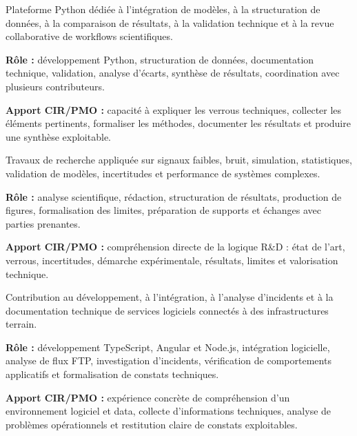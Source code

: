 \documentclass[8pt,a4paper,ragged2e,withhyper]{altacv}
\begin{document}
Plateforme Python dédiée à l’intégration de modèles, à la structuration de données, à la comparaison de résultats, à la validation technique et à la revue collaborative de workflows scientifiques.

\textbf{Rôle :} développement Python, structuration de données, documentation technique, validation, analyse d’écarts, synthèse de résultats, coordination avec plusieurs contributeurs.

\textbf{Apport CIR/PMO :} capacité à expliquer les verrous techniques, collecter les éléments pertinents, formaliser les méthodes, documenter les résultats et produire une synthèse exploitable.

\divider


Travaux de recherche appliquée sur signaux faibles, bruit, simulation, statistiques, validation de modèles, incertitudes et performance de systèmes complexes.

\textbf{Rôle :} analyse scientifique, rédaction, structuration de résultats, production de figures, formalisation des limites, préparation de supports et échanges avec parties prenantes.

\textbf{Apport CIR/PMO :} compréhension directe de la logique R\&D : état de l’art, verrous, incertitudes, démarche expérimentale, résultats, limites et valorisation technique.

\divider


Contribution au développement, à l’intégration, à l’analyse d’incidents et à la documentation technique de services logiciels connectés à des infrastructures terrain.

\textbf{Rôle :} développement TypeScript, Angular et Node.js, intégration logicielle, analyse de flux FTP, investigation d’incidents, vérification de comportements applicatifs et formalisation de constats techniques.

\textbf{Apport CIR/PMO :} expérience concrète de compréhension d’un environnement logiciel et data, collecte d’informations techniques, analyse de problèmes opérationnels et restitution claire de constats exploitables.


\vspace{-.3cm}
\end{document}
